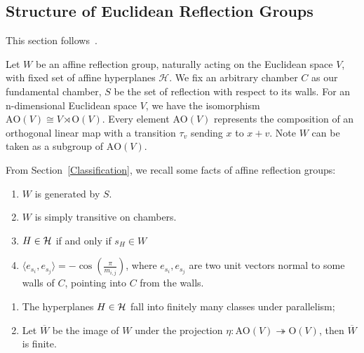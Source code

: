 \documentclass[../main.tex]{subfiles}
\begin{document}
\subsection{Structure of Euclidean Reflection Groups}

This section follows~\cite{AbramenkoBrown2008}.

Let $W$ be an affine reflection group, naturally acting on the Euclidean space $V$, with fixed set of affine hyperplanes $\mathcal H$. We fix an arbitrary chamber $C$ as our fundamental chamber, $S$ be the set of reflection with respect to its walls. For an n-dimensional Euclidean space $V$, we have the isomorphism $\text{AO}(V) \cong V \rtimes \text{O}(V)$. Every element $\text{AO}(V)$ represents the composition of an orthogonal linear map with a transition $\tau_v$ sending $x$ to $x+v$. Note $W$ can be taken as a subgroup of $\text{AO}(V)$.

From Section~\ref{Classification}, we recall some facts of affine reflection groups:\begin{enumerate}
    \item $W$ is generated by $S$.
    \item $W$ is simply transitive on chambers.
    \item $H\in \mathcal{H}$ if and only if $s_H \in W$
    \item $\langle e_{s_i},e_{s_j}\rangle=-\cos(\frac{\pi}{m_{i,j}})$, where $e_{s_i},e_{s_j}$ are two unit vectors normal to some walls of $C$, pointing into $C$ from the walls. 
\end{enumerate}

\begin{theorem}\label{thm:finpara}
    \begin{enumerate}
        \item The hyperplanes $H\in \mathcal{H}$ fall into finitely many classes under parallelism;
        \item Let $\overline W$ be the image of $W$ under the projection $\eta: \text{AO}(V) \twoheadrightarrow \text{O} (V)$, then $\overline W$ is finite.
    \end{enumerate}
\end{theorem}
\end{document}
